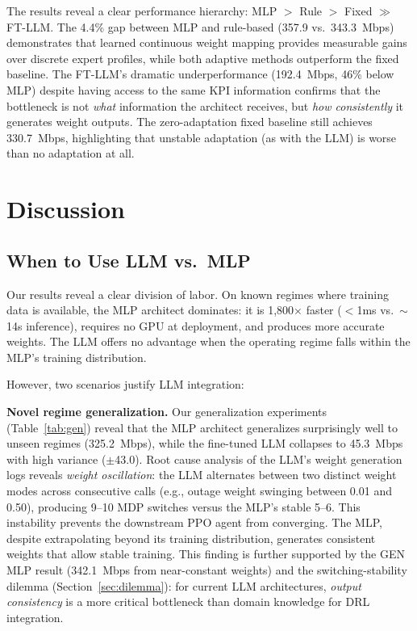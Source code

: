 \documentclass[conference]{IEEEtran}
\begin{document}
The results reveal a clear performance hierarchy: MLP $>$ Rule $>$ Fixed $\gg$ FT-LLM. The 4.4\% gap between MLP and rule-based (357.9 vs.\ 343.3~Mbps) demonstrates that learned continuous weight mapping provides measurable gains over discrete expert profiles, while both adaptive methods outperform the fixed baseline. The FT-LLM's dramatic underperformance (192.4~Mbps, 46\% below MLP) despite having access to the same KPI information confirms that the bottleneck is not \emph{what} information the architect receives, but \emph{how consistently} it generates weight outputs. The zero-adaptation fixed baseline still achieves 330.7~Mbps, highlighting that unstable adaptation (as with the LLM) is worse than no adaptation at all.

\section{Discussion}

\subsection{When to Use LLM vs.\ MLP}
Our results reveal a clear division of labor. On known regimes where training data is available, the MLP architect dominates: it is 1,800$\times$ faster ($<$1ms vs.\ $\sim$14s inference), requires no GPU at deployment, and produces more accurate weights. The LLM offers no advantage when the operating regime falls within the MLP's training distribution.

However, two scenarios justify LLM integration:

\textbf{Novel regime generalization.} Our generalization experiments (Table~\ref{tab:gen}) reveal that the MLP architect generalizes surprisingly well to unseen regimes (325.2~Mbps), while the fine-tuned LLM collapses to 45.3~Mbps with high variance ($\pm$43.0). Root cause analysis of the LLM's weight generation logs reveals \emph{weight oscillation}: the LLM alternates between two distinct weight modes across consecutive calls (e.g., outage weight swinging between 0.01 and 0.50), producing 9--10 MDP switches versus the MLP's stable 5--6. This instability prevents the downstream PPO agent from converging. The MLP, despite extrapolating beyond its training distribution, generates consistent weights that allow stable training. This finding is further supported by the GEN MLP result (342.1~Mbps from near-constant weights) and the switching-stability dilemma (Section~\ref{sec:dilemma}): for current LLM architectures, \emph{output consistency} is a more critical bottleneck than domain knowledge for DRL integration.
\end{document}
